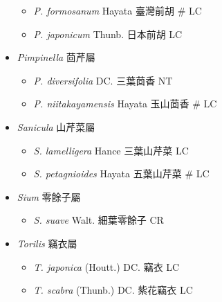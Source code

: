 \begin{itemize}
  \begin{itemize}
        \item[] \textit{P. formosanum} Hayata  臺灣前胡  \# LC
        \item[] \textit{P. japonicum} Thunb.  日本前胡   LC
  \end{itemize}
 \item[] \textit{Pimpinella} 茴芹屬
                                
  \begin{itemize}
        \item[] \textit{P. diversifolia} DC.  三葉茴香   NT
        \item[] \textit{P. niitakayamensis} Hayata  玉山茴香  \# LC
  \end{itemize}
 \item[] \textit{Sanicula} 山芹菜屬
                                
  \begin{itemize}
        \item[] \textit{S. lamelligera} Hance  三葉山芹菜   LC
        \item[] \textit{S. petagnioides} Hayata  五葉山芹菜  \# LC
  \end{itemize}
 \item[] \textit{Sium} 零餘子屬
                                
  \begin{itemize}
        \item[] \textit{S. suave} Walt.  細葉零餘子   CR
  \end{itemize}
 \item[] \textit{Torilis} 竊衣屬
                                
  \begin{itemize}
        \item[] \textit{T. japonica} (Houtt.) DC.  竊衣   LC
        \item[] \textit{T. scabra} (Thunb.) DC.  紫花竊衣   LC
  \end{itemize}
  \end{itemize}
